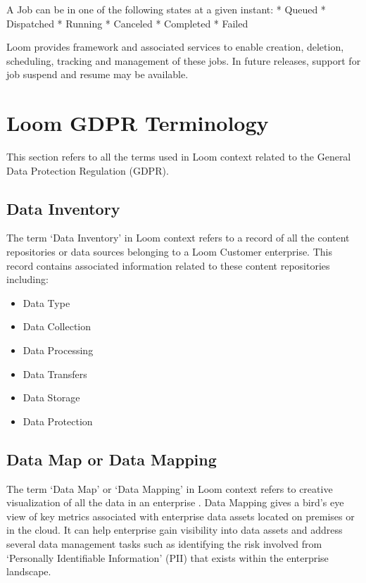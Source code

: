 \documentclass[letterpaper,10pt,english]{sphinxmanual}
\begin{document}
A Job can be in one of the following states at a given instant:
* Queued
* Dispatched
* Running
* Canceled
* Completed
* Failed

Loom provides framework and associated services to enable creation, deletion, scheduling, tracking and management of these jobs. In future releases, support for job suspend and resume may be available.


\section{Loom GDPR Terminology}
\label{\detokenize{mcdmp_concepts:loom-gdpr-terminology}}\label{\detokenize{mcdmp_concepts:term-loom-gdpr}}
This section refers to all the terms used in Loom context related to the General Data Protection Regulation (GDPR).


\subsection{Data Inventory}
\label{\detokenize{mcdmp_concepts:term-data-inv}}\label{\detokenize{mcdmp_concepts:data-inventory}}
The term ‘Data Inventory’ in Loom context refers to a record of all the content repositories or data sources belonging to a Loom Customer enterprise. This record contains associated information related to these content repositories including:
\begin{itemize}
\item {} 
Data Type

\item {} 
Data Collection

\item {} 
Data Processing

\item {} 
Data Transfers

\item {} 
Data Storage

\item {} 
Data Protection

\end{itemize}


\subsection{Data Map or Data Mapping}
\label{\detokenize{mcdmp_concepts:data-map-or-data-mapping}}\label{\detokenize{mcdmp_concepts:term-data-map}}
The term ‘Data Map’ or ‘Data Mapping’ in Loom context refers to creative visualization of all the data in an enterprise {\hyperref[\detokenize{mcdmp_concepts:term-data-inv}]{}}. Data Mapping gives a bird’s eye view of key metrics associated with enterprise data assets located on premises or in the cloud. It can help enterprise gain visibility into data assets and address several data management tasks such as identifying the risk involved from ‘Personally Identifiable Information’ (PII) that exists within the enterprise landscape.
\end{document}
